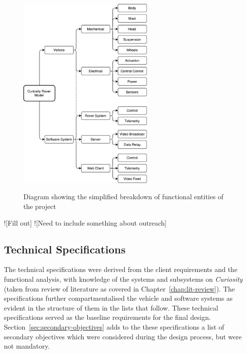     \begin{figure}[h]
      \centering
      \includegraphics[width=0.6\textwidth]{figures/specs-functionalBreakdown}
      \label{fig:specs-functionalBreakdown}
      \caption[Diagram showing the simplified breakdown of functional entities of the project]{Diagram showing the simplified breakdown of functional entities of the project}
    \end{figure}
    
    ![Fill out]
    ![Need to include something about outreach]
    
  \subsection{Technical Specifications}
    The technical specifications were derived from the client requirements and the functional analysis, with knowledge of the systems and subsystems on \textit{Curiosity} (taken from review of literature as covered in Chapter~\ref{chap:lit-review}). The specifications further compartmentalised the vehicle and software systems as evident in the structure of them in the lists that follow. These technical specifications served as the baseline requirements for the final design. Section~\ref{sec:secondary-objectives} adds to the these specifications a list of secondary objectives which were considered during the design process, but were not mandatory.
    
